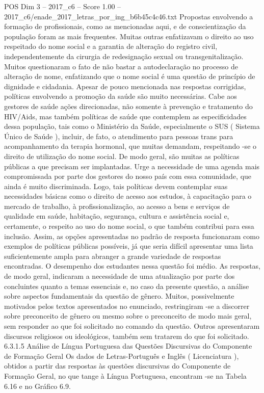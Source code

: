 \begin{textsample}{POS Dim 3 – 2017\_c6 – Score 1.00 – 2017\_c6/enade\_2017\_letras\_por\_ing\_b6b45c4c46.txt}
Propostas envolvendo a formação de profissionais, como as mencionadas aqui, e de conscientização da população foram as mais frequentes.
Muitas outras enfatizavam o direito ao uso respeitado do nome social e a garantia de alteração do registro civil, independentemente da cirurgia de redesignação sexual ou transgenitalização.
Muitos questionaram o fato de não bastar a autodeclaração no processo de alteração de nome, enfatizando que o nome social é uma questão de princípio de dignidade e cidadania.
Apesar de pouco mencionada nas respostas corrigidas, políticas envolvendo a promoção da saúde são muito necessárias.
Cabe aos gestores de saúde ações direcionadas, não somente à prevenção e tratamento do HIV/Aids, mas também políticas de saúde que contemplem as especificidades dessa população, tais como o Ministério da Saúde, especialmente o SUS ( Sistema Único de Saúde ), incluir, de fato, o atendimento para pessoas trans para acompanhamento da terapia hormonal, que muitas demandam, respeitando -se o direito de utilização do nome social.
De modo geral, são muitas as políticas públicas a que precisam ser implantadas.
Urge a necessidade de uma agenda mais compromissada por parte dos gestores do nosso país com essa comunidade, que ainda é muito discriminada.
Logo, tais políticas devem contemplar suas necessidades básicas como o direito de acesso aos estudos, à capacitação para o mercado de trabalho, à profissionalização, ao acesso a bens e serviços de qualidade em saúde, habitação, segurança, cultura e assistência social e, certamente, o respeito ao uso do nome social, o que também contribui para essa inclusão.
Assim, as opções apresentadas no padrão de resposta funcionaram como exemplos de políticas públicas possíveis, já que seria difícil apresentar uma lista suficientemente ampla para abranger a grande variedade de respostas encontradas.
O desempenho dos estudantes nessa questão foi médio.
As respostas, de modo geral, indicaram a necessidade de uma atualização por parte dos concluintes quanto a temas essenciais e, no caso da presente questão, a análise sobre aspectos fundamentais da questão de gênero.
Muitos, possivelmente motivados pelos textos apresentados no enunciado, restringiram -se a discorrer sobre preconceito de gênero ou mesmo sobre o preconceito de modo mais geral, sem responder ao que foi solicitado no comando da questão.
Outros apresentaram discursos religiosos ou ideológicos, também sem tratarem do que foi solicitado. 6.3.1.5 Análise de Língua Portuguesa das Questões Discursivas do Componente de Formação Geral Os dados de Letras-Português e Inglês ( Licenciatura ), obtidos a partir das respostas às questões discursivas do Componente de Formação Geral, no que tange à Língua Portuguesa, encontram -se na Tabela 6.16 e no Gráfico 6.9.

\end{textsample}
